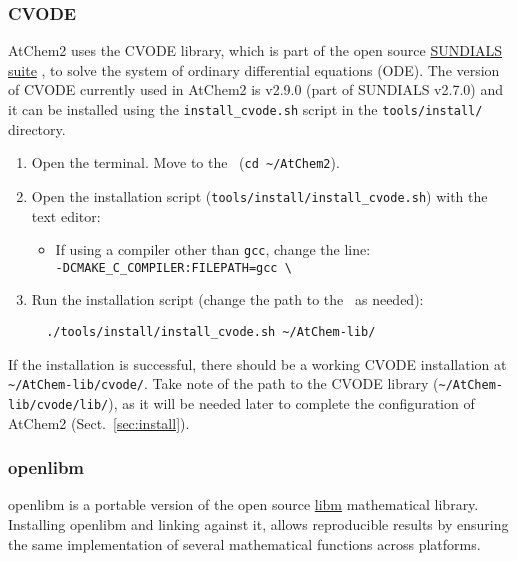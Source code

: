 \subsubsection{CVODE}

AtChem2 uses the CVODE library, which is part of the open source
\href{https://computing.llnl.gov/projects/sundials}{SUNDIALS suite}
\citep{hindmarsh_2005}, to solve the system of ordinary differential
equations (ODE). The version of CVODE currently used in AtChem2 is
v2.9.0 (part of SUNDIALS v2.7.0) and it can be installed using the
\texttt{install\_cvode.sh} script in the \texttt{tools/install/}
directory.

\begin{enumerate}
\item Open the terminal. Move to the \maindir\ (\verb|cd ~/AtChem2|).
\item Open the installation script (\texttt{tools/install/install\_cvode.sh})
  with the text editor:
  \begin{itemize}
  \item If using a compiler other than \texttt{gcc}, change the line:\\
    \texttt{-DCMAKE\_C\_COMPILER:FILEPATH=gcc \textbackslash}
  \end{itemize}
\item Run the installation script (change the path to the \depdir\ as
  needed):
  \begin{verbatim}
  ./tools/install/install_cvode.sh ~/AtChem-lib/
  \end{verbatim}
\end{enumerate}

If the installation is successful, there should be a working CVODE
installation at \texttt{\textasciitilde/AtChem-lib/cvode/}. Take note
of the path to the CVODE library (\texttt{\textasciitilde/AtChem-lib/cvode/lib/}),
as it will be needed later to complete the configuration of AtChem2
(Sect.~\ref{sec:install}).

\subsubsection{openlibm}

openlibm is a portable version of the open source
\href{https://openlibm.org}{libm} mathematical library. Installing
openlibm and linking against it, allows reproducible results by
ensuring the same implementation of several mathematical functions
across platforms.

